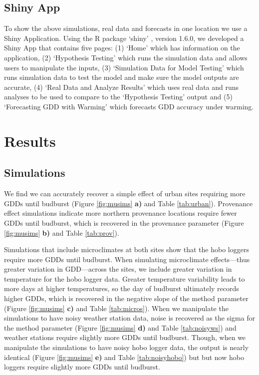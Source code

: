 \documentclass{article}\usepackage[]{graphicx}\usepackage[]{color}
\begin{document}
\subsection*{Shiny App}
To show the above simulations, real data and forecasts in one location we use a Shiny Application. Using the R package `shiny' \citep{shiny2021}, version 1.6.0, we developed a Shiny App that contains five pages: (1) `Home' which has information on the application, (2) `Hypothesis Testing' which runs the simulation data and allows users to manipulate the inputs, (3) `Simulation Data for Model Testing' which runs simulation data to test the model and make sure the model outputs are accurate, (4) `Real Data and Analyze Results' which uses real data and runs analyses to be used to compare to the `Hypothesis Testing' output and (5) `Forecasting GDD with Warming' which forecasts GDD accuracy under warming. 

\section*{Results}
\subsection*{Simulations}
We find we can accurately recover a simple effect of urban sites requiring more GDDs until budburst (Figure \ref{fig:musims} \textbf{a)} and Table \ref{tab:urban}). Provenance effect simulations indicate more northern provenance locations require fewer GDDs until budburst, which is recovered in the provenance parameter (Figure \ref{fig:musims} \textbf{b)} and Table \ref{tab:prov}). 

Simulations that include microclimates at both sites show that the hobo loggers require more GDDs until budburst. When simulating microclimate effects---thus greater variation in GDD---across the sites, we include greater variation in temperature for the hobo logger data. Greater temperature variability leads to more days at higher temperatures, so the day of budburst ultimately records higher GDDs, which is recovered in the negative slope of the method parameter (Figure \ref{fig:musims} \textbf{c)} and Table \ref{tab:micros}). When we manipulate the simulations to have noisy weather station data, noise is recovered as the sigma for the method parameter (Figure \ref{fig:musims} \textbf{d)} and Table \ref{tab:noisyws}) and weather stations require slightly more GDDs until budburst. Though, when we manipulate the simulations to have noisy hobo logger data, the output is nearly identical (Figure \ref{fig:musims} \textbf{e)} and Table \ref{tab:noisyhobo}) but but now hobo loggers require slightly more GDDs until budburst.
  
\end{document}

